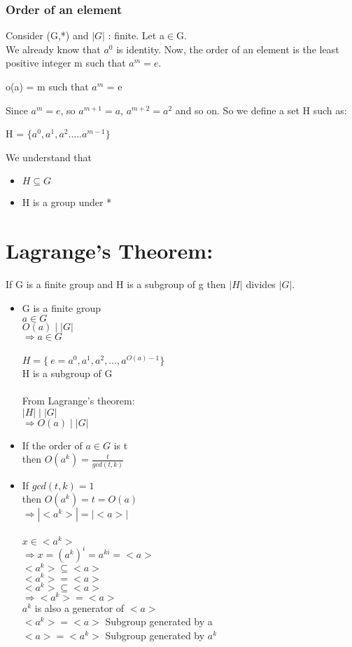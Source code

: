 \documentclass[11pt]{article}
\begin{document}
\subsubsection{Order of an element}
Consider (G,*) and $|G|$ : finite. Let a$\in$G.\\
We already know that $a^0$ is identity. Now, the order of an element is the least positive integer m such that $a^m = e$. 
\begin{center}
    o(a) = m such that $a^m$ = e
\end{center}
Since $a^m = e$, so $a^{m+1}=a$, $a^{m+2}=a^2$ and so on. So we define a set H such as:
\begin{center}
    H = $\{a^0, a^1, a^2.....a^{m-1}\}$
\end{center}
We understand that
\begin{itemize}
    \item $H \subseteq G$
    \item H is a group under *
\end{itemize}


\section*{Lagrange's Theorem:}
If G is a finite group and H is a subgroup of g then $|H|$ divides $|G|.$
\begin{itemize}
    \item G is a finite group \\
    $a \in G$ \\
    $O(a) \mid |G|$ \\
    $\Rightarrow a \in G $\\\\ 
    $H = \{\ e = a^0, a^1, a^2, \dots, a^{O(a)-1} \}\ $ \\
    H is a subgroup of G \\\\
    From Lagrange's theorem: \\
    $|H| \mid |G| $\\
    $\Rightarrow O(a) \mid |G|$
    \item If the order of $a \in G $ is t \\
    then $O(a^k) = \frac{t}{gcd(t, k)}$
    \item If $gcd(t,k) = 1$\\
    then $O(a^k) = t = O(a)$\\
    $\Rightarrow  |<a^k>| = |<a>| $ \\\\
    $x \in <a^k>$\\
    $\Rightarrow x = (a^k)^i = a^{ki} = <a>$ \\
    
        $<a^k> \subseteq <a>$ \\
        $<a^k> = <a>$ \\
        $<a^k> \subseteq <a>$ \\
        $\Rightarrow <a^k> = <a>$\\
        {$a^k$ is also a generator of $<a>$}\\
    $<a^k> = <a> $ Subgroup generated by a \\
    $<a> = <a^k>$ Subgroup generated by $a^k$ 
\end{itemize}
\end{document}
